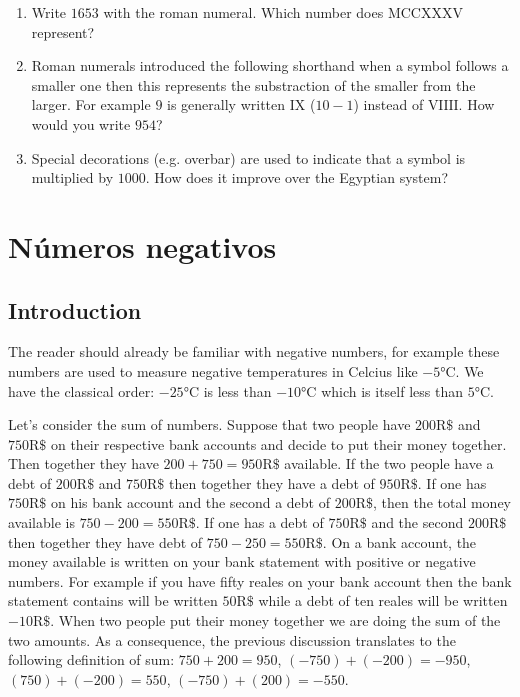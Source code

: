 \begin{enumerate}
\item Write $1653$ with the roman numeral. Which number does
  $\text{MCCXXXV}$ represent?
\item Roman numerals introduced the following shorthand when a
  symbol follows a smaller one then this represents the substraction of the
  smaller from the larger. For example $9$ is generally written $\text{IX}$
  ($10-1$) instead of $\text{VIIII}$. How would you write $954$?
\item Special decorations (e.g. overbar) are used to
  indicate that a symbol is multiplied by $1000$. How does it improve over
  the Egyptian system?
\end{enumerate}

\section{Números negativos}

\subsection*{Introduction}

The reader should already be familiar with negative numbers,
for example these numbers are used to measure
negative temperatures in Celcius like $-5°\text{C}$. We have the classical
order: $-25°\text{C}$ is less than $-10°\text{C}$ which is itself less than
$5°\text{C}$.

Let's consider the sum of numbers.
Suppose that two people have $200\text{R\$}$ and $750\text{R\$}$ on
their respective bank accounts and decide to put their money together.
Then together they have $200+750=950\text{R\$}$ available. If the
two people have a debt of $200\text{R\$}$ and $750\text{R\$}$ then together
they have a debt of $950\text{R\$}$. If one has $750\text{R\$}$
on his bank account and the second a debt of $200\text{R\$}$, then the
total money available is $750 - 200 = 550\text{R\$}$. If one has a debt
of $750\text{R\$}$ and the second $200\text{R\$}$ then together they have debt
of $750-250=550\text{R\$}$.
On a bank account, the money available is written on your bank statement
with positive or negative numbers. For example if you have fifty reales on your
bank account then the bank statement contains will be written $50\text{R\$}$
while a debt of ten reales will be written $-10\text{R\$}$. When two people
put their money together we are doing the sum of the two amounts. As a
consequence, the previous discussion translates to the following definition of
sum: $750+200=950$, ${(-750)} + {(-200)} = -950$,
${(750)} + {(-200)} = 550$, ${(-750)} + {(200)} = -550$.

